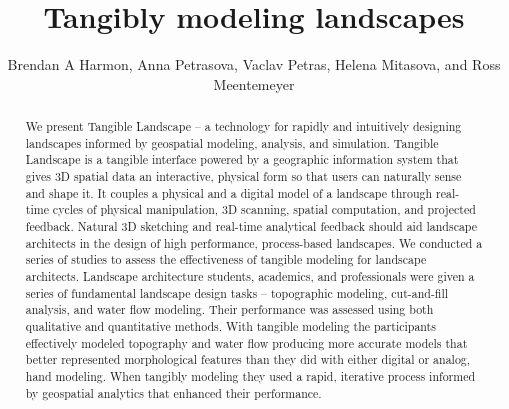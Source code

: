 \documentclass[Afour,sagev,times]{sagej} %
\begin{document}
\title{Tangibly modeling landscapes}
\author{Brendan A Harmon, Anna Petrasova, Vaclav Petras, Helena Mitasova, and Ross Meentemeyer}


\begin{abstract}
We present Tangible Landscape 
-- a technology for rapidly and intuitively designing landscapes
informed by geospatial modeling, analysis, and simulation.
Tangible Landscape is a tangible interface 
powered by a geographic information system 
that gives 3D spatial data an interactive, physical form so that 
users can naturally sense and shape it.
It couples a physical and a digital model of a landscape
through real-time cycles of 
physical manipulation, 3D scanning, 
spatial computation, and projected feedback.
Natural 3D sketching and real-time analytical feedback should aid
landscape architects in the design of 
high performance, process-based landscapes.
We conducted a series of studies to assess the effectiveness of 
tangible modeling for landscape architects.
Landscape architecture students, academics, and professionals 
were given a series of fundamental landscape design tasks 
-- topographic modeling, cut-and-fill analysis, and water flow modeling. 
Their performance was assessed 
using both qualitative and quantitative methods.
With tangible modeling the participants
effectively modeled topography and water flow 
producing more accurate models 
that better represented morphological features 
than they did with either digital or analog, hand modeling.
When tangibly modeling
they used a rapid, iterative process informed by geospatial analytics 
that enhanced their performance.  
\end{abstract}


\maketitle
\end{document}
